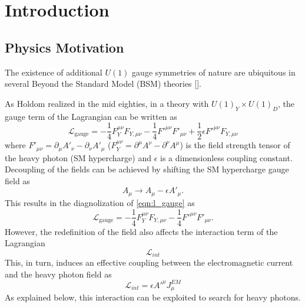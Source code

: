 \chapter{Introduction}

\section{Physics Motivation}

The existence of additional $U(1)$ gauge symmetries of nature are ubiquitous in
several Beyond the Standard Model (BSM) theories [].  

As Holdom \cite{holdom1986} realized in the mid eighties, in a theory with 
$U(1)_Y \times U(1)_D$, the gauge term of the Lagrangian can be written as 
\begin{equation}
    \mathcal{L}_{\text{gauge}} = - \frac{1}{4} F_Y^{\mu \nu}F_{Y, \mu \nu}
                          - \frac{1}{4} F'^{\mu \nu}F'_{\mu \nu}
                          + \frac{1}{2} \epsilon F'^{\mu \nu} F_{Y, \mu \nu}
    \label{eqn:l_gauge}
\end{equation}
where $F'_{\mu \nu} = \partial_{\mu}A'_{\nu} - \partial_{\nu}A'_{\mu}$ 
($F^{\mu \nu}_{Y} = \partial^{\mu}A^{\nu} - \partial^{\nu}A^{\mu}$) is the
field strength tensor of the heavy photon (SM hypercharge) and $\epsilon$ is a
dimensionless coupling constant.  Decoupling of the fields can be achieved by 
shifting the SM hypercharge gauge field as 
\begin{equation}
    A_{\mu} \rightarrow A_{\mu} - \epsilon A'_{\mu}.
\end{equation}
This results in the diagnolization of \ref{eqn:l_gauge} as
\begin{equation}
    \mathcal{L}_{\text{gauge}} = - \frac{1}{4} F_Y^{\mu \nu}F_{Y, \mu \nu}
                          - \frac{1}{4} F'^{\mu \nu}F'_{\mu \nu}.
\end{equation}
However, the redefinition of the field also affects the interaction term of 
the Lagrangian
\begin{equation}
    \mathcal{L}_{int} 
\end{equation}
This, in turn, induces an effective coupling between the electromagnetic current
and the heavy photon field as 
\begin{equation}
    \mathcal{L}_{int} = \epsilon A'^{\mu}J_{\mu}^{EM}
\end{equation}
As explained below, this interaction can be exploited to search for heavy 
photons.


